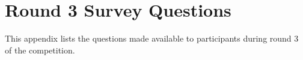 \chapter{Round 3 Survey Questions}
\label{app:round-3-survey}

This appendix lists the questions made available to participants during round 3 of the competition.

